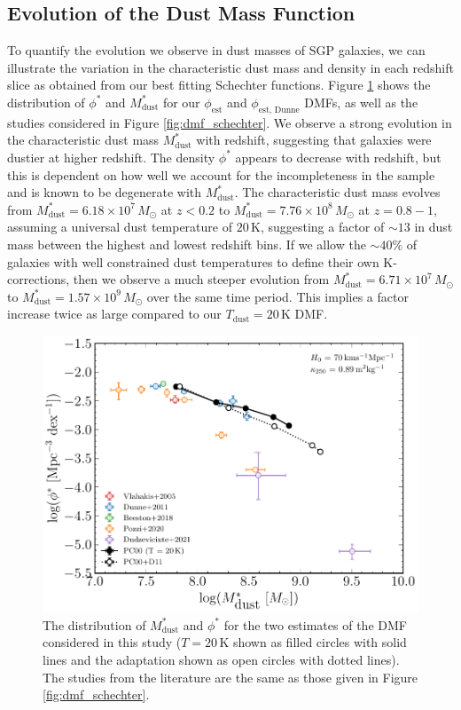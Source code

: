 \subsection{Evolution of the Dust Mass Function}

To quantify the evolution we observe in dust masses of SGP galaxies, we can illustrate the variation in the characteristic dust mass and density in each redshift slice as obtained from our best fitting Schechter functions. Figure \ref{fig:dmf_schechter_parameters} shows the distribution of $\phi^*$ and $M_{\textrm{dust}}^*$ for our $\phi_{\textrm{est}}$ and $\phi_{\textrm{est, Dunne}}$ DMFs, as well as the studies considered in Figure \ref{fig:dmf_schechter}. We observe a strong evolution in the characteristic dust mass $M_{\textrm{dust}}^*$ with redshift, suggesting that galaxies were dustier at higher redshift. The density $\phi^*$ appears to decrease with redshift, but this is dependent on how well we account for the incompleteness in the sample and is known to be degenerate with $M_{\textrm{dust}}^*$. The characteristic dust mass evolves from $M_{\textrm{dust}}^* = 6.18\times10^7\,M_{\odot}$ at $z < 0.2$ to $M_{\textrm{dust}}^* = 7.76\times10^8\,M_{\odot}$ at $z = 0.8 - 1$, assuming a universal dust temperature of $20\,$K, suggesting a factor of $\sim 13$ in dust mass between the highest and lowest redshift bins. If we allow the $\sim 40\%$ of galaxies with well constrained dust temperatures to define their own K-corrections, then we observe a much steeper evolution from $M_{\textrm{dust}}^* = 6.71\times10^7\,M_{\odot}$ to $M_{\textrm{dust}}^* = 1.57\times10^9\,M_{\odot}$ over the same time period. This implies a factor increase twice as large compared to our $T_{\textrm{dust}} = 20\,$K DMF.

\begin{figure}
	\centering
	\includegraphics[width=0.75\columnwidth]{Figures/dmf_schechter_parameters.pdf}
	\caption[Distribution of $M_{\textrm{dust}}^*$ and $\phi^*$ from best fitting Schechter functions]{The distribution of $M_{\textrm{dust}}^*$ and $\phi^*$ for the two estimates of the DMF considered in this study ($T = 20\,$K shown as filled circles with solid lines and the \citealt{Dunne_2011} adaptation shown as open circles with dotted lines). The studies from the literature are the same as those given in Figure \ref{fig:dmf_schechter}.}
	\label{fig:dmf_schechter_parameters}
\end{figure}

